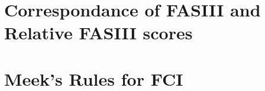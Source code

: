 \documentclass[main.tex]{subfiles}
\begin{document}
\section{Correspondance of FASIII and Relative FASIII scores}
\label{appendix:FASIII_RelFAS}





\section{Meek's Rules for FCI } 
\label{appendix:Meek_FCI}
\end{document}
